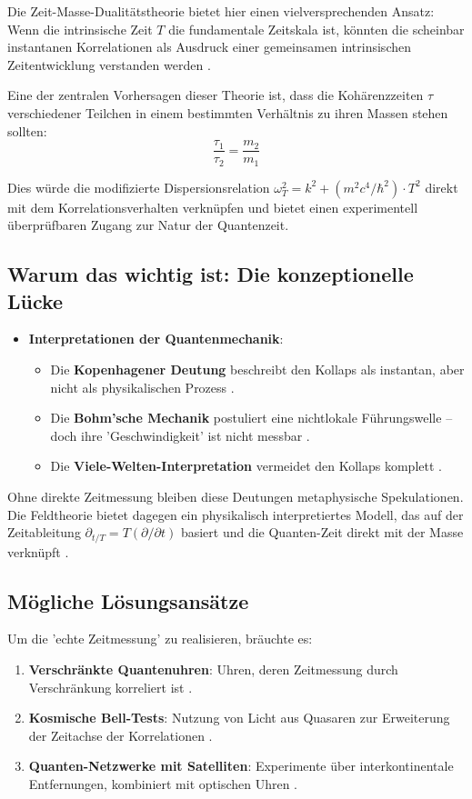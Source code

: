 \documentclass[a4paper,12pt]{article}
\begin{document}
	Die Zeit-Masse-Dualitätstheorie bietet hier einen vielversprechenden Ansatz: Wenn die intrinsische Zeit $T$ die fundamentale Zeitskala ist, könnten die scheinbar instantanen Korrelationen als Ausdruck einer gemeinsamen intrinsischen Zeitentwicklung verstanden werden \cite{Pascher2024}. 
	
	Eine der zentralen Vorhersagen dieser Theorie ist, dass die Kohärenzzeiten $\tau$ verschiedener Teilchen in einem bestimmten Verhältnis zu ihren Massen stehen sollten:
	\begin{equation}
		\frac{\tau_1}{\tau_2} = \frac{m_2}{m_1}
	\end{equation}
	
	Dies würde die modifizierte Dispersionsrelation $\omega_T^2 = k^2 + (m^2c^4/\hbar^2)\cdot T^2$ direkt mit dem Korrelationsverhalten verknüpfen und bietet einen experimentell überprüfbaren Zugang zur Natur der Quantenzeit.
	
	\subsection{Warum das wichtig ist: Die konzeptionelle Lücke}
	\begin{itemize}
		\item \textbf{Interpretationen der Quantenmechanik}:
		\begin{itemize}
			\item Die \textbf{Kopenhagener Deutung} beschreibt den Kollaps als instantan, aber nicht als physikalischen Prozess \cite{Schlosshauer2013}.
			\item Die \textbf{Bohm'sche Mechanik} postuliert eine nichtlokale Führungswelle – doch ihre 'Geschwindigkeit' ist nicht messbar \cite{Bohm1980}.
			\item Die \textbf{Viele-Welten-Interpretation} vermeidet den Kollaps komplett \cite{Wallace2012}.
		\end{itemize}
	\end{itemize}
	
	Ohne direkte Zeitmessung bleiben diese Deutungen metaphysische Spekulationen. Die Feldtheorie bietet dagegen ein physikalisch interpretiertes Modell, das auf der Zeitableitung $\partial_{t/T} = T(\partial/\partial t)$ basiert und die Quanten-Zeit direkt mit der Masse verknüpft \cite{Pascher2024}.
	
	\subsection{Mögliche Lösungsansätze}
	Um die 'echte Zeitmessung' zu realisieren, bräuchte es:
	\begin{enumerate}
		\item \textbf{Verschränkte Quantenuhren}: Uhren, deren Zeitmessung durch Verschränkung korreliert ist \cite{Jozsa2000}.
		\item \textbf{Kosmische Bell-Tests}: Nutzung von Licht aus Quasaren zur Erweiterung der Zeitachse der Korrelationen \cite{Handsteiner2017}.
		\item \textbf{Quanten-Netzwerke mit Satelliten}: Experimente über interkontinentale Entfernungen, kombiniert mit optischen Uhren \cite{Yin2017}.
	\end{enumerate}
	
\end{document}
